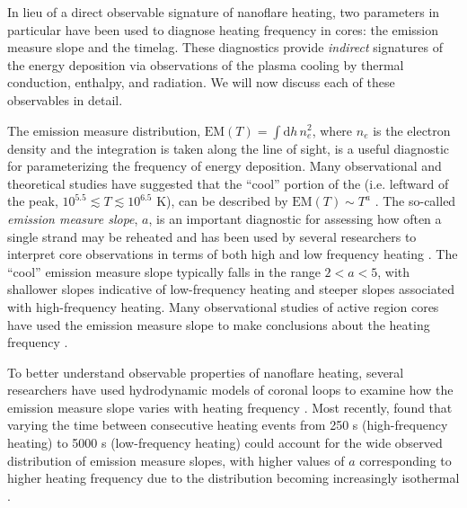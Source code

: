 In lieu of a direct observable signature of nanoflare heating, two parameters in particular have been used to diagnose heating frequency in \AR{} cores: the emission measure slope and the timelag. These diagnostics provide \textit{indirect} signatures of the energy deposition via observations of the plasma cooling by thermal conduction, enthalpy, and radiation. We will now discuss each of these observables in detail.

The emission measure distribution, $\mathrm{EM}(T)=\int\mathrm{d}h\,n_e^2$, where $n_e$ is the electron density and the integration is taken along the line of sight, is a useful diagnostic for parameterizing the frequency of energy deposition. Many observational and theoretical studies have suggested that the ``cool'' portion of the \dem{} (i.e. leftward of the peak, $10^{5.5}\lesssim T\lesssim10^{6.5}$ K), can be described by $\mathrm{EM}(T)\sim T^a$ \citep{jordan_structure_1976,cargill_implications_1994,cargill_nanoflare_2004}. The so-called \textit{emission measure slope}, $a$, is an important diagnostic for assessing how often a single strand may be reheated and has been used by several researchers to interpret \AR{} core observations in terms of both high and low frequency heating \citep[see Table 3 of][and references therein]{bradshaw_diagnosing_2012}. The ``cool'' emission measure slope typically falls in the range $2<a<5$, with shallower slopes indicative of low-frequency heating and steeper slopes associated with high-frequency heating. Many observational studies of active region cores have used the emission measure slope to make conclusions about the heating frequency \citep[e.g.][]{tripathi_emission_2011,warren_constraints_2011,winebarger_using_2011,schmelz_cold_2012,warren_systematic_2012,del_zanna_evolution_2015}.

To better understand observable properties of nanoflare heating, several researchers have used hydrodynamic models of coronal loops to examine how the emission measure slope varies with heating frequency \citep{mulu-moore_can_2011,bradshaw_diagnosing_2012,reep_diagnosing_2013}. Most recently, \citet{cargill_active_2014} found that varying the time between consecutive heating events from 250 s (high-frequency heating) to 5000 s (low-frequency heating) could account for the wide observed distribution of emission measure slopes, with higher values of $a$ corresponding to higher heating frequency due to the \dem{} distribution becoming increasingly isothermal \citep[see also][]{barnes_inference_2016-1}.

